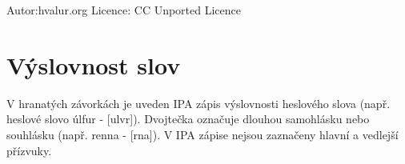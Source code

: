 \documentclass[twocolumn]{book}
\begin{document}
\par\begin{center}\setlength\fboxsep{0pt}\setlength\fboxrule{0.5pt}\end{center}
\par\begin{center}\footnotesize {Autor:hvalur.org Licence: CC Unported Licence}\end{center}

\section{Výslovnost slov }
V hranatých závorkách je uveden IPA zápis výslovnosti heslového slova (např. heslové slovo úlfur - [ulv{\textscy}r]). Dvojtečka označuje dlouhou samohlásku nebo souhlásku (např. renna - [r{\textepsilon}n{\textlengthmark}a]). V IPA zápise nejsou zaznačeny hlavní a vedlejší přízvuky.

\clearpage
\makeatletter\@openrightfalse
\end{document}
